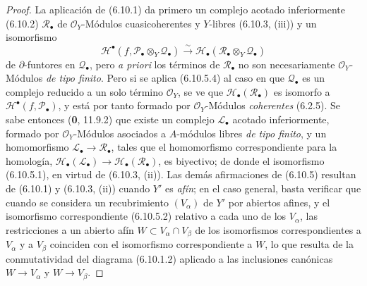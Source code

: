 \begin{proof}
La aplicación de (6.10.1) da primero un complejo acotado inferiormente
(6.10.2) $\mathscr R_\bullet$ de $\mathscr O_Y$-Módulos cuasicoherentes y
$Y$-libres (6.10.3, (iii)) y un isomorfismo
\[
  \mathscr H^\bullet
  (f,\mathscr P_\bullet\otimes_Y\mathscr Q_\bullet)
  \xrightarrow{\sim}
  \mathscr H_\bullet
  (\mathscr R_\bullet\otimes_Y\mathscr Q_\bullet)
  \tag{6.10.5.4}\label{III.6.10.5.4.fr}
\]
de $\partial$-funtores en $\mathscr Q_\bullet$, pero \emph{a priori} los
términos de $\mathscr R_\bullet$ no son necesariamente
$\mathscr O_Y$-Módulos \emph{de tipo finito}. Pero si se aplica (6.10.5.4) al caso
en que $\mathscr Q_\bullet$ es un complejo reducido a un solo término
$\mathscr O_Y$, se ve que $\mathscr H_\bullet(\mathscr R_\bullet)$ es
isomorfo a $\mathscr H^\bullet(f,\mathscr P_\bullet)$, y está por tanto formado
por $\mathscr O_Y$-Módulos \emph{coherentes} (6.2.5). Se sabe entonces (\textbf{0}, 11.9.2) que
existe un complejo $\mathscr L_\bullet$ acotado inferiormente, formado por
$\mathscr O_Y$-Módulos asociados a $A$-módulos libres \emph{de tipo finito}, y un
homomorfismo $\mathscr L_\bullet\longrightarrow\mathscr R_\bullet$,
tales que el homomorfismo correspondiente para la homología,
$\mathscr H_\bullet(\mathscr L_\bullet)\longrightarrow\mathscr H_\bullet(\mathscr R_\bullet)$,
es biyectivo; de donde el isomorfismo (6.10.5.1), en virtud de (6.10.3, (ii)).
Las demás afirmaciones de (6.10.5) resultan de (6.10.1) y (6.10.3, (ii))
cuando $Y'$ es \emph{afín}; en el caso general, basta verificar que
cuando se considera un recubrimiento $(V_\alpha)$ de $Y'$ por abiertos
afines, y el isomorfismo correspondiente (6.10.5.2) relativo a cada uno de los
$V_\alpha$, las restricciones a un abierto afín
$W\subset V_\alpha\cap V_\beta$ de los isomorfismos correspondientes a
$V_\alpha$ y a $V_\beta$ coinciden con el isomorfismo correspondiente a
$W$, lo que resulta de la conmutatividad del diagrama (6.10.1.2) aplicado a las
inclusiones canónicas $W\to V_\alpha$ y $W\to V_\beta$.
\end{proof}

